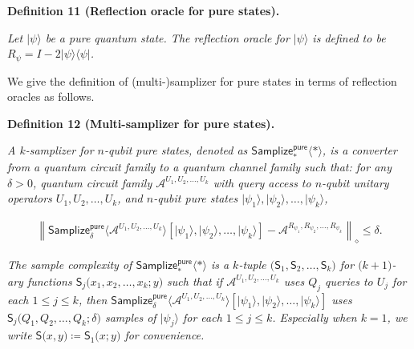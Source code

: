 \documentclass[10pt,a4paper]{article}
\begin{document}


\par\medskip\noindent\textbf{
\textbf{Definition 11}\textbf{ }(Reflection oracle for pure states)\textbf{.}
}\par



\emph{Let $\lvert\psi\rangle$ be a pure quantum state.
The reflection oracle for $\lvert\psi\rangle$ is defined to be $R_{\psi}=I-2\lvert\psi\rangle\!\langle\psi\rvert$.}\par






We give the definition of (multi-)samplizer for pure states in terms of reflection oracles as follows.\par





\par\medskip\noindent\textbf{
\textbf{Definition 12}\textbf{ }(Multi-samplizer for pure states)\textbf{.}
}\par



\emph{A $k$-samplizer for $n$-qubit pure states, denoted as $\mathsf{Samplize}^{\mathsf{pure}}_{*}\langle*\rangle$, is a converter from a quantum circuit family to a quantum channel family such that:
for any $\delta>0$, quantum circuit family $\mathcal{A}^{U_{1},U_{2},\dots,U_{k}}$ with query access to $n$-qubit unitary operators $U_{1},U_{2},\dots,U_{k}$, and $n$-qubit pure states $\lvert\psi_{1}\rangle,\lvert\psi_{2}\rangle,\dots,\lvert\psi_{k}\rangle$,}\par


\[\begin{gathered}
\left\lVert\mathsf{Samplize}^{\mathsf{pure}}_{\delta}\langle\mathcal{A}^{U_{1},U_{2},\dots,U_{k}}\rangle[\lvert\psi_{1}\rangle,\lvert\psi_{2}\rangle,\dots,\lvert\psi_{k}\rangle]-\mathcal{A}^{R_{\psi_{1}},R_{\psi_{2}},\dots,R_{\psi_{k}}}\right\rVert_{\diamond}\leq\delta.
\end{gathered}\]




\emph{The sample complexity of $\mathsf{Samplize}^{\mathsf{pure}}_{*}\langle*\rangle$ is a $k$-tuple $\lparen\mathsf{S}_{1},\mathsf{S}_{2},\dots,\mathsf{S}_{k}\rparen$ for $\lparen k+1\rparen$-ary functions $\mathsf{S}_{j}\lparen x_{1},x_{2},\dots,x_{k};y\rparen$ such that if $\mathcal{A}^{U_{1},U_{2},\dots,U_{k}}$ uses $Q_{j}$ queries to $U_{j}$ for each $1\leq j\leq k$, then $\mathsf{Samplize}^{\mathsf{pure}}_{\delta}\langle\mathcal{A}^{U_{1},U_{2},\dots,U_{k}}\rangle[\lvert\psi_{1}\rangle,\lvert\psi_{2}\rangle,\dots,\lvert\psi_{k}\rangle]$ uses $\mathsf{S}_{j}\lparen Q_{1},Q_{2},\dots,Q_{k};\delta\rparen$ samples of $\lvert\psi_{j}\rangle$ for each $1\leq j\leq k$.
Especially when $k=1$, we write $\mathsf{S}\lparen x,y\rparen\coloneqq\mathsf{S}_{1}\lparen x;y\rparen$ for convenience.}\par
\end{document}
